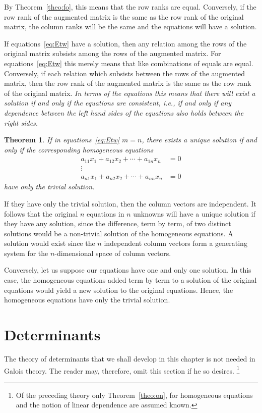 \documentclass[10pt,leqno,a5paper]{book}
\newtheorem{theo}{Theorem}
\theoremstyle{definition}
\let\htw\section
\begin{document}
By Theorem~\ref{theo:fo}, this means that the row ranks are equal.
Conversely, if the row rank of the augmented matrix is the same as the row rank of the original matrix, the column ranks will be the same and the equations will have a solution.

If equations~\eqref{eq:Etw} have a solution, then any relation among the rows of the original matrix subsists among the rows of the augmented matrix.
For equations~\eqref{eq:Etw} this merely means that like combinations of equals are equal.
Conversely, if each relation which subsists between the rows of the augmented matrix, then the row rank of the augmented matrix is the same as the row rank of the original matrix.
\emph{In terms of the equations this means that there will exist a solution if and only if the equations are consistent, i.e., if and only if any dependence between the left hand sides of the equations also holds between the right sides.}


\begin{theo}
\label{theo:fi}
If in equations~\eqref{eq:Etw} $m = n$, there exists a unique solution if and only if the corresponding homogeneous equations
\begin{align*}
a_{11}x_1 + a_{12}x_2 + \cdots + a_{1n}x_n &= 0
\\
\vdots &
\\
a_{n1}x_1 + a_{n2}x_2 + \cdots + a_{nn}x_n &= 0
\end{align*}
have only the trivial solution.
\end{theo}


If they have only the trivial solution, then the column vectors are independent.
It follows that the original $n$ equations in $n$ unknowns will have a unique solution if they have any solution, since the difference, term by term, of two distinct solutions would be a non-trivial solution of the homogeneous equations.
A solution would exist since the $n$ independent column vectors form a generating system for the $n$-dimensional space of column vectors.

Conversely, let us suppose our equations have one and only one solution.
In this case, the homogeneous equations added term by term to a solution of the original equations would yield a new solution to the original equations.
Hence, the homogeneous equations have only the trivial solution.


\htw{Determinants}

The theory of determinants that we shall develop in this chapter is not need\-ed in Galois theory.
The reader may, therefore, omit this section if he so desires.%
\footnote{Of the preceding theory only Theorem~\ref{theo:on}, for homogeneous equations and the notion of linear dependence are assumed known.}
\end{document}
